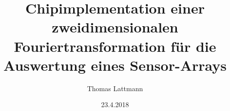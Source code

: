 














	
\usepackage{bbding}					%

\usepackage{enumerate}					%

\usepackage{pdfpages}					%
\usepackage{pgfpages}
\usepackage{float}					%
\usepackage{booktabs}					%
\usepackage{framed}					%

\usepackage{titling}
\author{Thomas Lattmann}
\title{Chipimplementation einer zweidimensionalen Fouriertransformation für die Auswertung eines Sensor-Arrays}
\date{23.4.2018}
			




\usepackage[ngerman]{varioref}		            	%




\usepackage[noend]{algpseudocode}
